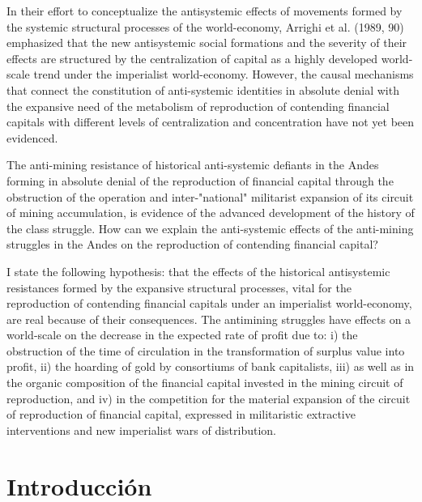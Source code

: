\documentclass[
]{article}
\begin{document}
In their effort to conceptualize the antisystemic effects of movements
formed by the systemic structural processes of the world-economy,
Arrighi et al. (1989, 90) emphasized that the new antisystemic social
formations and the severity of their effects are structured by the
centralization of capital as a highly developed world-scale trend under
the imperialist world-economy. However, the causal mechanisms that
connect the constitution of anti-systemic identities in absolute denial
with the expansive need of the metabolism of reproduction of contending
financial capitals with different levels of centralization and
concentration have not yet been evidenced.

The anti-mining resistance of historical anti-systemic defiants in the
Andes forming in absolute denial of the reproduction of financial
capital through the obstruction of the operation and inter-"national"
militarist expansion of its circuit of mining accumulation, is evidence
of the advanced development of the history of the class struggle. How
can we explain the anti-systemic effects of the anti-mining struggles in
the Andes on the reproduction of contending financial capital?

I state the following hypothesis: that the effects of the historical
antisystemic resistances formed by the expansive structural processes,
vital for the reproduction of contending financial capitals under an
imperialist world-economy, are real because of their consequences. The
antimining struggles have effects on a world-scale on the decrease in
the expected rate of profit due to: i) the obstruction of the time of
circulation in the transformation of surplus value into profit, ii) the
hoarding of gold by consortium\textquotesingle s of bank capitalists,
iii) as well as in the organic composition of the financial capital
invested in the mining circuit of reproduction, and iv) in the
competition for the material expansion of the circuit of reproduction of
financial capital, expressed in militaristic extractive interventions
and new imperialist wars of distribution.

\hypertarget{introducciuxf3n}{%
\section{Introducción}\label{introducciuxf3n}}
\end{document}
